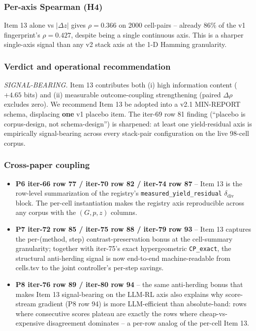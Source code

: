 \subsubsection{Per-axis Spearman (H4)}
Item 13 alone vs $|\Delta z|$ gives $\rho = 0.366$ on 2000 cell-pairs --
already 86\% of the v1 fingerprint's $\rho = 0.427$, despite being a
single continuous axis. This is a sharper single-axis signal than any
v2 stack axis at the 1-D Hamming granularity.

\subsubsection{Verdict and operational recommendation}
\textit{SIGNAL-BEARING.} Item 13 contributes both
(i) high information content ($+4.65$ bits) and
(ii) measurable outcome-coupling strengthening (paired $\Delta\rho$ excludes zero).
We recommend Item 13 be adopted into a v2.1 MIN-REPORT schema, displacing
\textbf{one} v1 placebo item. The iter-69 row 81 finding (``placebo is
corpus-design, not schema-design'') is sharpened: at least one
yield-residual axis is empirically signal-bearing across every stack-pair
configuration on the live 98-cell corpus.

\subsubsection{Cross-paper coupling}
\begin{itemize}
  \item \textbf{P6 iter-66 row 77 / iter-70 row 82 / iter-74 row 87} --
        Item 13 is the row-level summarization of the registry's
        \texttt{measured\_yield\_residual} $\delta_{\mathrm{div}}$ block.
        The per-cell instantiation makes the registry axis reproducible
        across any corpus with the $(G, p, z)$ columns.
  \item \textbf{P7 iter-72 row 85 / iter-75 row 88 / iter-79 row 93} --
        Item 13 captures the per-(method, step) contrast-preservation bonus
        at the cell-summary granularity; together with iter-75's exact
        hypergeometric \texttt{CP\_exact}, the structural anti-herding signal
        is now end-to-end machine-readable from cells.tsv to the joint
        controller's per-step savings.
  \item \textbf{P8 iter-76 row 89 / iter-80 row 94} -- the same
        anti-herding bonus that makes Item 13 signal-bearing on the LLM-RL
        axis also explains why score-stream gradient (P8 row 94) is more
        LLM-efficient than absolute-band: rows where consecutive scores
        plateau are exactly the rows where cheap-vs-expensive disagreement
        dominates -- a per-row analog of the per-cell Item 13.
\end{itemize}
